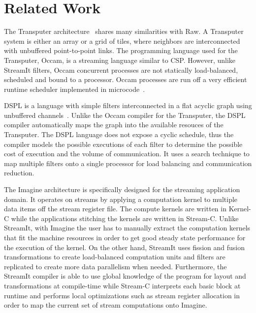 \section{Related Work}
\label{sec:related}

The Transputer architecture~\cite{transputer88} shares many
similarities with Raw.  A Transputer system is either an array or a
grid of tiles, where neighbors are interconnected with unbuffered
point-to-point links. The programming language used for the
Transputer, Occam, is a streaming language similar to CSP.  However,
unlike StreamIt filters, Occam concurrent processes are not statically
load-balanced, scheduled and bound to a processor. Occam processes are
run off a very efficient runtime scheduler implemented in
microcode~\cite{may87communicating}.

DSPL is a language with simple filters interconnected in a flat acyclic
graph using unbuffered channels~\cite{Thiel93}.  Unlike the Occam
compiler for the Transputer, the DSPL compiler automatically maps the
graph into the available resouces of the Transputer. The DSPL language
does not expose a cyclic schedule, thus the compiler models the
possible executions of each filter to determine the possible cost of
execution and the volume of communication. It uses a search technique
to map multiple filters onto a single processor for load balancing and
communication reduction. 


The Imagine architecture is specifically designed for the streaming
application domain.  It operates on streams by applying a computation
kernel to multiple data items off the stream register file.  The
compute kernels are written in Kernel-C while the applications
stitching the kernels are written in Stream-C.  Unlike StreamIt, with
Imagine the user has to manually extract the computation kernels that
fit the machine resources in order to get good steady state
performance for the execution of the kernel.  On the other hand,
StreamIt uses fission and fusion transformations to create
load-balanced computation units and filters are replicated to create
more data parallelism when needed.  Furthermore, the StreamIt compiler
is able to use global knowledge of the program for layout and
transformations at compile-time while Stream-C interprets each basic
block at runtime and performs local optimizations such as stream
register allocation in order to map the current set of stream
computations onto Imagine.

% 
%
